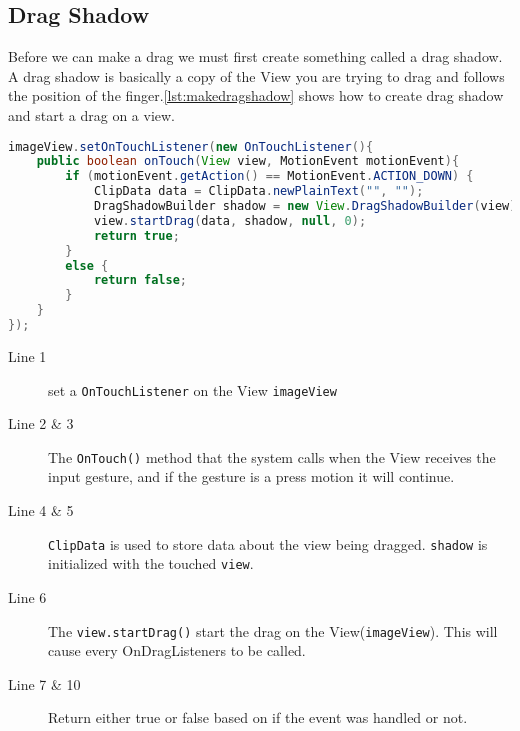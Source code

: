 \subsection*{Drag Shadow}
Before we can make a drag we must first create something called a drag shadow. A drag shadow is basically a copy of the View you are trying to drag and follows the position of the finger.\autoref{lst:makedragshadow} shows how to create drag shadow and start a drag on a view.
\begin{lstlisting}[language=java,firstnumber=1,caption={How to create a drag shadow, and start drag},label=lst:makedragshadow]
imageView.setOnTouchListener(new OnTouchListener(){
	public boolean onTouch(View view, MotionEvent motionEvent){
		if (motionEvent.getAction() == MotionEvent.ACTION_DOWN) {
			ClipData data = ClipData.newPlainText("", "");
			DragShadowBuilder shadow = new View.DragShadowBuilder(view);
			view.startDrag(data, shadow, null, 0);
			return true;
		}
		else {
			return false;
		}	
	}
});
\end{lstlisting}
\begin{description}
\item[Line 1] set a \lstinline|OnTouchListener| on the View \lstinline|imageView|
\item[Line 2 \& 3] The \lstinline|OnTouch()| method that the system calls when the View receives the input gesture, and if the gesture is a press motion it will continue.
\item[Line 4 \& 5] \lstinline|ClipData| is used to store data about the view being dragged. \lstinline|shadow| is initialized with the touched \lstinline|view|.
\item[Line 6] The \lstinline|view.startDrag()| start the drag on the View(\lstinline|imageView|). This will cause every OnDragListeners to be called. 
\item[Line 7 \& 10] Return either true or false based on if the event was handled or not.
\end{description}
